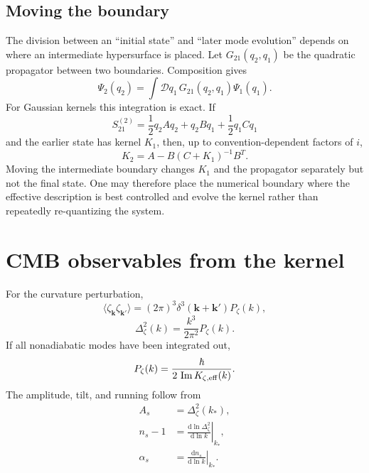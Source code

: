 \documentclass[aps,prd,twocolumn,superscriptaddress,nofootinbib,longbibliography]{revtex4-2}
\newcommand{\dd}{\mathrm d}
\begin{document}
\subsection{Moving the boundary}
The division between an ``initial state'' and ``later mode evolution'' depends on where an intermediate hypersurface is placed. Let $G_{21}(q_2,q_1)$ be the quadratic propagator between two boundaries. Composition gives
\begin{equation}
\Psi_2(q_2)=\int\mathcal Dq_1\,G_{21}(q_2,q_1)\Psi_1(q_1).
\end{equation}
For Gaussian kernels this integration is exact. If
\begin{equation}
S_{21}^{(2)}=\frac12q_2Aq_2+q_2Bq_1+\frac12q_1Cq_1
\end{equation}
and the earlier state has kernel $K_1$, then, up to convention-dependent factors of $i$,
\begin{equation}
K_2=A-B(C+K_1)^{-1}B^T.
\label{eq:compose}
\end{equation}
Moving the intermediate boundary changes $K_1$ and the propagator separately but not the final state. One may therefore place the numerical boundary where the effective description is best controlled and evolve the kernel rather than repeatedly re-quantizing the system.

\section{CMB observables from the kernel}
\label{sec:observables}

For the curvature perturbation,
\begin{equation}
\langle\zeta_{\bm k}\zeta_{\bm k'}\rangle
=(2\pi)^3\delta^3(\bm k+\bm k')P_\zeta(k),
\end{equation}
\begin{equation}
\Delta_\zeta^2(k)=\frac{k^3}{2\pi^2}P_\zeta(k).
\end{equation}
If all nonadiabatic modes have been integrated out,
\begin{equation}
P_\zeta(k)=\frac{\hbar}{2\,\operatorname{Im}K_{\zeta,\rm eff}(k)}.
\label{eq:pzeta}
\end{equation}
The amplitude, tilt, and running follow from
\begin{align}
A_s&=\Delta_\zeta^2(k_*),\\
n_s-1&=\left.\frac{\dd\ln\Delta_\zeta^2}{\dd\ln k}\right|_{k_*},\\
\alpha_s&=\left.\frac{\dd n_s}{\dd\ln k}\right|_{k_*}.
\end{align}
\end{document}

